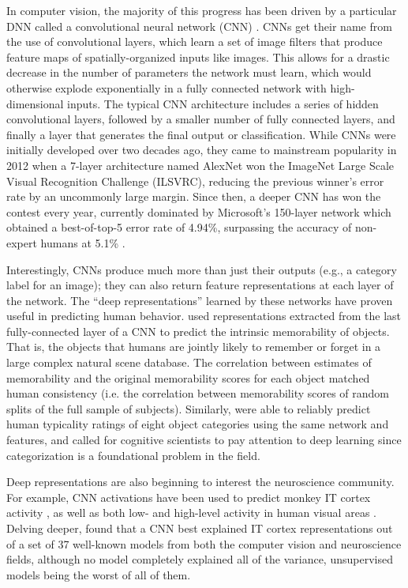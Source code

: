 \documentclass[10pt,letterpaper]{article}
\begin{document}
In computer vision, the majority of this progress has been driven by a particular DNN called a convolutional neural network (CNN) \citep*{lecun1989backpropagation}. CNNs get their name from the use of convolutional layers, which learn a set of image filters that produce feature maps of spatially-organized inputs like images. This allows for a drastic decrease in the number of parameters the network must learn, which would otherwise explode exponentially in a fully connected network with high-dimensional inputs. The typical CNN architecture includes a series of hidden convolutional layers, followed by a smaller number of fully connected layers, and finally a layer that generates the final output or classification. While CNNs were initially developed over two decades ago, they came to mainstream popularity in 2012 when a 7-layer architecture named AlexNet \citep*{krizhevsky2012imagenet} won the ImageNet Large Scale Visual Recognition Challenge (ILSVRC), reducing the previous winner's error rate by an uncommonly large margin. Since then, a deeper CNN has won the contest every year, currently dominated by Microsoft's 150-layer network which obtained a best-of-top-5 error rate of 4.94\%, surpassing the accuracy of non-expert humans at 5.1\% \citep*{he2015delving}.

Interestingly, CNNs produce much more than just their outputs (e.g., a category label for an image); they can also return feature representations at each layer of the network. The ``deep representations'' learned by these networks have proven useful in predicting human behavior. \cite*{ICCV15_ObjectMemorability} used representations extracted from the last fully-connected layer of a CNN to predict the intrinsic memorability of objects. That is, the objects that humans are jointly likely to remember or forget in a large complex natural scene database. The correlation between estimates of memorability and the original memorability scores for each object matched human consistency (i.e. the correlation between memorability scores of random splits of the full sample of subjects). Similarly, \cite*{lake_deep_2015} were able to reliably predict human typicality ratings of eight object categories using the same network and features, and called for cognitive scientists to pay attention to deep learning since categorization is a foundational problem in the field.

Deep representations are also beginning to interest the neuroscience community. For example, CNN activations have been used to predict monkey IT cortex activity \citep*{yamins2014performance}, as well as both low- and high-level activity in human visual areas \citep*{agrawal_pixels_2014}. Delving deeper, \cite*{khaligh-razavi_deep_2014} found that a CNN best explained IT cortex representations out of a set of 37 well-known models from both the computer vision and neuroscience fields, although no model completely explained all of the variance, unsupervised models being the worst of all of them.
\end{document}
